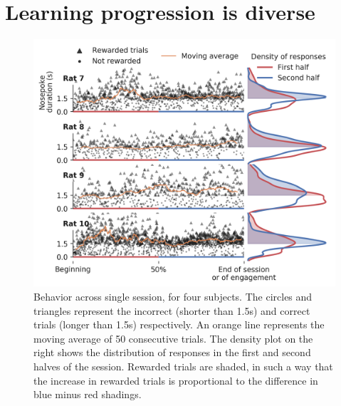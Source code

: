 \section{Learning progression is diverse}
    \begin{figure}[ht!]
        \centering
        \includegraphics[width=\textwidth]{figures/behavior_group_1_with_avg_bold.png}
        \caption[Behavior across single session]{Behavior across single session, for four subjects. The circles and triangles represent the incorrect (shorter than 1.5s) and correct trials (longer than 1.5s) respectively. An orange line represents the moving average of 50 consecutive trials. The density plot on the right shows the distribution of responses in the first and second halves of the session. Rewarded trials are shaded, in such a way that the increase in rewarded trials is proportional to the difference in blue minus red shadings.}
        \label{fig:behavior}
    \end{figure} 
    
